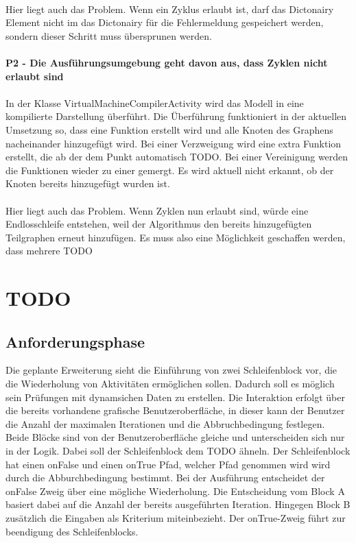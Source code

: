 \documentclass{article}
\begin{document}
        \\
        Hier liegt auch das Problem. Wenn ein Zyklus erlaubt ist, darf das Dictonairy Element nicht im das Dictonairy für die Fehlermeldung gespeichert werden, sondern dieser Schritt muss übersprunen werden.\\
        \\
        \textbf{P2 - Die Ausführungsumgebung geht davon aus, dass Zyklen nicht erlaubt sind}\\
        \\
        In der Klasse VirtualMachineCompilerActivity wird das Modell in eine kompilierte Darstellung überführt. 
        Die Überführung funktioniert in der aktuellen Umsetzung so, dass eine Funktion erstellt wird und alle Knoten des Graphens nacheinander hinzugefügt wird.
        Bei einer Verzweigung wird eine extra Funktion erstellt, die ab der dem Punkt automatisch TODO. Bei einer Vereinigung werden die Funktionen wieder zu einer gemergt.
        Es wird aktuell nicht erkannt, ob der Knoten bereits hinzugefügt wurden ist.
        \\\\Hier liegt auch das Problem. Wenn Zyklen nun erlaubt sind, würde eine Endlosschleife entstehen, weil der Algorithmus den bereits hinzugefügten Teilgraphen erneut hinzufügen.
        Es muss also eine Möglichkeit geschaffen werden, dass mehrere TODO
    \newpage
    \section{TODO}
    \subsection{Anforderungsphase}
    Die geplante Erweiterung sieht die Einführung von zwei Schleifenblock vor, die die Wiederholung von Aktivitäten ermöglichen sollen. Dadurch soll es möglich sein Prüfungen mit dynamsichen Daten zu erstellen.
    Die Interaktion erfolgt über die bereits vorhandene grafische Benutzeroberfläche, in dieser kann der Benutzer die Anzahl der maximalen Iterationen und die Abbruchbedingung festlegen.
    Beide Blöcke sind von der Benutzeroberfläche gleiche und unterscheiden sich nur in der Logik.
    Dabei soll der Schleifenblock dem TODO ähneln. 
    Der Schleifenblock hat einen onFalse und einen onTrue Pfad, welcher Pfad genommen wird wird durch die Abburchbedingung bestimmt.
    Bei der Ausführung entscheidet der onFalse Zweig über eine mögliche Wiederholung. Die Entscheidung vom Block A basiert dabei auf die Anzahl der bereits ausgeführten Iteration. Hingegen Block B zusätzlich die Eingaben als Kriterium miteinbezieht.
    Der onTrue-Zweig führt zur beendigung des Schleifenblocks.
\end{document}
